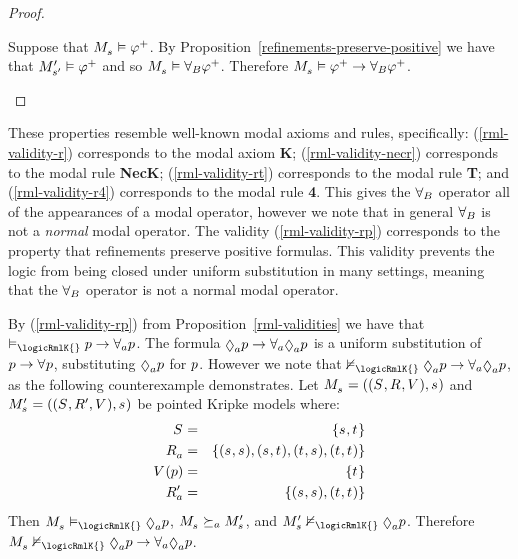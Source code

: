 \begin{proof}
\begin{description}
        Suppose that $\kPModel{\kStateS} \entails \phi^+$.
        By Proposition~\ref{refinements-preserve-positive} we have that ${M^{\prime}_{{s}^{\prime}}} \vDash \varphi^+$ and so $\kPModel{\kStateS} \entails \allrefsBs \phi^+$.
        Therefore $\kPModel{\kStateS} \entails \phi^+ \implies \allrefsBs \phi^+$.
\end{description}
\end{proof}

These properties resemble well-known modal axioms and rules, specifically:
(\ref{rml-validity-r}) corresponds to the modal axiom {\bf K};
(\ref{rml-validity-necr}) corresponds to the modal rule {\bf NecK};
(\ref{rml-validity-rt}) corresponds to the modal rule {\bf T}; and
(\ref{rml-validity-r4}) corresponds to the modal rule {\bf 4}.
This gives the ${\forall_{B}}$ operator all of the appearances of a modal operator, however we note that in general ${\forall_{B}}$ is not a {\em normal} modal operator.
The validity (\ref{rml-validity-rp}) corresponds to the property that refinements preserve positive formulas.
This validity prevents the logic from being closed under uniform substitution in many settings, meaning that the ${\forall_{B}}$ operator is not a normal modal operator.

\begin{example}\label{example-uniform-substitution}
By (\ref{rml-validity-rp}) from Proposition~\ref{rml-validities} we have that $\entails_\logicRmlK{} \atomP \implies \allrefsA \atomP$.
The formula $\possibleA \atomP \implies \allrefsA \possibleA \atomP$ is a uniform substitution of $\atomP \implies \allrefs \atomP$, substituting $\possibleA \atomP$ for $p$.
However we note that $\nentails_\logicRmlK{} \possibleA \atomP \implies \allrefsA \possibleA \atomP$, as the following counterexample demonstrates.
Let $\kPModelAndTuple{\kStateS}$ and $\kPModelP{\kStateS} = ((\kStates, \kAccessibilityP{}, \kValuation), \kStateS)$ be pointed Kripke models where:
\begin{eqnarray*}
    \kStates &=& \{\kStateS, \kStateT\}\\
    \kAccessibilityA &=& \{(\kStateS, \kStateS), (\kStateS, \kStateT), (\kStateT, \kStateS), (\kStateT, \kStateT)\}\\
    \kValuation(\atomP) &=& \{\kStateT\}\\
    \kAccessibilityPA &=& \{(\kStateS, \kStateS), (\kStateT, \kStateT)\}
\end{eqnarray*}
Then $\kPModel{\kStateS} \entails_\logicRmlK{} \possibleA \atomP$, $\kPModel{\kStateS} \simulatesA \kPModelP{\kStateS}$, and $\kPModelP{\kStateS} \nentails_\logicRmlK{} \possibleA \atomP$.
Therefore $\kPModel{\kStateS} \nentails_\logicRmlK{} \possibleA \atomP \implies \allrefsA \possibleA \atomP$.
\end{example}

